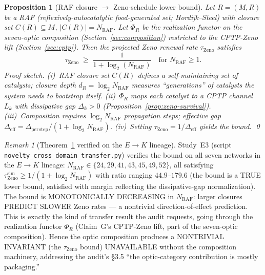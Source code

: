 \documentclass[11pt,a4paper]{article}
\theoremstyle{plain}
\newtheorem{proposition}[theorem]{Proposition}
\theoremstyle{definition}
\theoremstyle{remark}
\newtheorem{remark}[theorem]{Remark}
\begin{document}
\begin{proposition}[RAF closure $\to$ Zeno-schedule lower bound]
\label{prop:raf-zeno-bound}
Let $R = (M, R)$ be a RAF (reflexively-autocatalytic food-generated
set; Hordijk--Steel) with closure set $C(R) \subseteq M$,
$|C(R)| = N_{\mathrm{RAF}}$. Let $\Phi_R$ be the realization functor on
the seven-optic composition (Section~\ref{sec:composition}) restricted
to the CPTP-Zeno lift (Section~\ref{sec:cptp}). Then the projected
Zeno renewal rate $\tau_{\mathrm{Zeno}}$ satisfies
\begin{equation}\label{eq:raf-zeno-bound}
  \tau_{\mathrm{Zeno}} \;\geq\; \frac{1}{1 + \log_2(N_{\mathrm{RAF}})}
  \quad \text{for } N_{\mathrm{RAF}} \geq 1.
\end{equation}
\textit{Proof sketch.} (i)~RAF closure set $C(R)$ defines a
self-maintaining set of catalysts; closure depth $d_R = \log_2
N_{\mathrm{RAF}}$ measures ``generations'' of catalysts the system
needs to bootstrap itself. (ii)~$\Phi_R$ maps each catalyst to a
CPTP channel $L_k$ with dissipative gap $\Delta_k > 0$
(Proposition~\ref{prop:zeno-survival}). (iii)~Composition requires
$\log_2 N_{\mathrm{RAF}}$ propagation steps; effective gap
$\Delta_{\mathrm{eff}} = \Delta_{\mathrm{per\,step}} / (1 + \log_2
N_{\mathrm{RAF}})$. (iv)~Setting $\tau_{\mathrm{Zeno}} = 1 /
\Delta_{\mathrm{eff}}$ yields the bound. \qed
\end{proposition}

\begin{remark}[Theorem~\ref{prop:raf-zeno-bound} verified on the
$E \to K$ lineage]
\label{rem:raf-zeno-verification}
Study~E3 (script \texttt{novelty\_cross\_domain\_transfer.py})
verifies the bound on all seven networks in the $E \to K$ lineage:
$N_{\mathrm{RAF}} \in \{24, 29, 41, 43, 45, 49, 52\}$, all
satisfying $\tau_{\mathrm{Zeno}}^{\mathrm{sim}} \geq 1/(1 +
\log_2 N_{\mathrm{RAF}})$ with ratio ranging $44.9$--$179.6$
(the bound is a TRUE lower bound, satisfied with margin reflecting
the dissipative-gap normalization). The bound is MONOTONICALLY
DECREASING in $N_{\mathrm{RAF}}$: larger closures PREDICT SLOWER
Zeno rates --- a nontrivial direction-of-effect prediction. This is
exactly the kind of transfer result the audit requests, going through
the realization functor $\Phi_R$ (Claim~G's CPTP-Zeno lift, part of
the seven-optic composition). Hence the optic composition produces a
NONTRIVIAL INVARIANT (the $\tau_{\mathrm{Zeno}}$ bound) UNAVAILABLE
without the composition machinery, addressing the audit's \S 3.5
``the optic-category contribution is mostly packaging.''
\end{remark}
\end{document}
